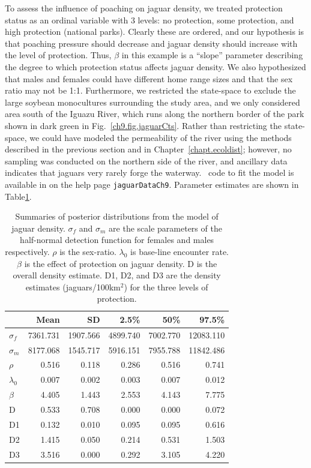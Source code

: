 To assess the influence of poaching on jaguar density, we treated
protection status as an ordinal variable with 3 levels: no protection,
some protection, and high protection (national parks). Clearly these
are ordered, and our
hypothesis is that poaching pressure should decrease and jaguar
density should increase with the level of
protection. Thus, $\beta$ in this example is a ``slope''
parameter describing the degree to which protection status affects
jaguar density. We also hypothesized that males and females could have
different home range sizes and that the sex ratio may not be
1:1. Furthermore, we restricted the state-space to exclude the large
soybean monocultures surrounding the study area, and we only
considered
area south of the Iguazu River, which runs along the northern border
of the park shown in dark green in
Fig.~\ref{ch9.fig.jaguarCts}. Rather than restricting the
state-space, we could have modeled the permeability of the river using
the methods described in the previous section and in
Chapter~\ref{chapt.ecoldist}; however, no sampling was conducted on
the northern side of the river, and ancillary data indicates that
jaguars very rarely forge the waterway. \R~code to fit the model is
available in \scrbook  on the help page \verb+jaguarDataCh9+. Parameter
estimates are shown in Table\ref{ch9.tab.jagposts}.
\begin{table}
\centering
\caption{Summaries of posterior distributions from the model of jaguar
  density. $\sigma_f$ and $\sigma_m$ are the scale parameters of
  the half-normal detection function for females and males
  respectively. $\rho$ is the
  sex-ratio. $\lambda_0$ is base-line encounter rate. $\beta$ is the
  effect of protection on jaguar density. D is the overall density
  estimate. D1, D2, and D3 are the density estimates
  (jaguars/100km$^2$) for the three levels of protection. }
\begin{tabular}{lrrrrr}
\hline
& Mean & SD & 2.5\% & 50\% & 97.5\% \\
\hline
 $\sigma_f$ &  7361.731 &  1907.566 &  4899.740 &  7002.770 & 12083.110 \\
 $\sigma_m$ &  8177.068 &  1545.717 &  5916.151 &  7955.788 & 11842.486 \\
 $\rho$ &     0.516 &     0.118 &     0.286 &     0.516 &     0.741 \\
 $\lambda_0$ &     0.007 &     0.002 &     0.003 &     0.007 &     0.012 \\
 $\beta$ &     4.405 &     1.443 &     2.553 &     4.143 &     7.775 \\
 D &     0.533 &     0.708 &     0.000 &     0.000 &     0.072 \\
 D1 &     0.132 &     0.010 &     0.095 &     0.095 &     0.616 \\
 D2 &     1.415 &     0.050 &     0.214 &     0.531 &     1.503 \\
 D3 &     3.516 &     0.000 &     0.292 &     3.105 &     4.220 \\
\hline
\end{tabular}
\label{ch9.tab.jagposts}
\end{table}

